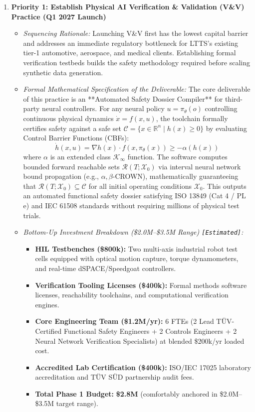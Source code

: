\documentclass[11pt,a4paper]{article}
\begin{document}
\begin{enumerate}
    \item \textbf{Priority 1: Establish Physical AI Verification \& Validation (V\&V) Practice (Q1 2027 Launch)}
    \begin{itemize}
        \item \textit{Sequencing Rationale:} Launching V\&V first has the lowest capital barrier and addresses an immediate regulatory bottleneck for LTTS's existing tier-1 automotive, aerospace, and medical clients. Establishing formal verification testbeds builds the safety methodology required before scaling synthetic data generation.
        \item \textit{Formal Mathematical Specification of the Deliverable:}
        The core deliverable of this practice is an **Automated Safety Dossier Compiler** for third-party neural controllers. For any neural policy $u = \pi_\theta(o)$ controlling continuous physical dynamics $\dot{x} = f(x, u)$, the toolchain formally certifies safety against a safe set $\mathcal{C} = \{x \in \mathbb{R}^n \mid h(x) \ge 0\}$ by evaluating Control Barrier Functions (CBFs):
        \[
        \dot{h}(x, u) = \nabla h(x) \cdot f(x, \pi_\theta(x)) \ge -\alpha(h(x))
        \]
        where $\alpha$ is an extended class $\mathcal{K}_{\infty}$ function. The software computes bounded forward reachable sets $\mathcal{R}(T; \mathcal{X}_0)$ via interval neural network bound propagation (e.g., $\alpha,\beta$-CROWN), mathematically guaranteeing that $\mathcal{R}(T; \mathcal{X}_0) \subseteq \mathcal{C}$ for all initial operating conditions $\mathcal{X}_0$. This outputs an automated functional safety dossier satisfying ISO 13849 (Cat 4 / PL e) and IEC 61508 standards without requiring millions of physical test trials.
        \item \textit{Bottom-Up Investment Breakdown (\$2.0M--\$3.5M Range) \texttt{[Estimated]}:}
        \begin{itemize}
            \item \textbf{HIL Testbenches (\$800k):} Two multi-axis industrial robot test cells equipped with optical motion capture, torque dynamometers, and real-time dSPACE/Speedgoat controllers.
            \item \textbf{Verification Tooling Licenses (\$400k):} Formal methods software licenses, reachability toolchains, and computational verification engines.
            \item \textbf{Core Engineering Team (\$1.2M/yr):} 6 FTEs (2 Lead TÜV-Certified Functional Safety Engineers + 2 Controls Engineers + 2 Neural Network Verification Specialists) at blended \$200k/yr loaded cost.
            \item \textbf{Accredited Lab Certification (\$400k):} ISO/IEC 17025 laboratory accreditation and TÜV SÜD partnership audit fees.
            \item \textbf{Total Phase 1 Budget:} \textbf{\$2.8M} (comfortably anchored in \$2.0M--\$3.5M target range).
        \end{itemize}
    \end{itemize}


\end{enumerate}
\end{document}
